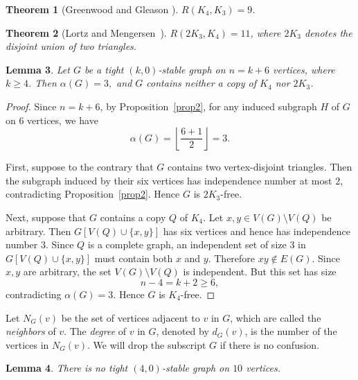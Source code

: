 \def\CTeXPreproc{Created by ctex v0.2.14, don't edit!}\def\CTeXPreproc{Created by ctex v0.2.14, don't edit!}\documentclass[11pt, twoside]{article}
\newtheorem{lem}{Lemma}[section]
\newtheorem{thm}[lem]{Theorem}
\begin{document}
\begin{thm}[Greenwood and Gleason \cite{GreenwoodGleason1955}]\label{thm:RG}
	$R(K_4, K_3) = 9$.
\end{thm}

\begin{thm}[Lortz and Mengersen~\cite{LortzMengersen2011}]\label{thm:Ramsey2K3}
	$R(2K_3, K_4)=11$, where $2K_3$ denotes the disjoint union of two triangles.
\end{thm}


\begin{lem}\label{lem:c6}
	Let $G$ be a tight $(k,0)$-stable graph on $n=k+6$ vertices, where $ k\ge4 $. Then $	\alpha(G)=3,$ and $G$ contains neither a copy of $K_4$ nor $2K_3$.
\end{lem}

\begin{proof}
	Since $n=k+6$, by Proposition~\ref{prop2}, for any induced subgraph $ H $ of $ G $ on $ 6 $ vertices, we have
	\[
	\alpha(G)=\left\lfloor \frac{6+1}{2}\right\rfloor=3.
	\]
	
	First, suppose to the contrary that $G$ contains two vertex-disjoint triangles. Then the
	subgraph induced by their six vertices has independence number at most
	$2$, contradicting Proposition~\ref{prop2}. Hence $G$ is
	$2K_3$-free.
	
	Next, suppose that $G$ contains a copy $Q$ of $K_4$. Let
	$x,y\in V(G)\setminus V(Q)$ be arbitrary. Then $G[V(Q)\cup\{x,y\}]$ has
	six vertices and hence has independence number $3$. Since $Q$ is a
	complete graph, an independent set of size $3$ in
	$G[V(Q)\cup\{x,y\}]$ must contain both $x$ and $y$. Therefore
	$xy\notin E(G)$. Since $x,y$ are arbitrary, the set
	$V(G)\setminus V(Q)$ is independent. But this set has size
	\[
	n-4=k+2\geq 6,
	\]
	contradicting $\alpha(G)=3$. Hence $G$ is $K_4$-free.
\end{proof}

Let $ N_G(v) $ be the set of vertices adjacent to $ v $ in $ G $, which are called the  \textit{neighbors} of $ v $. The \textit{degree} of $ v $ in $ G $, denoted by $ d_G(v) $, is the number of the vertices in $ N_G(v) $. We will drop the subscript $ G $ if there is no confusion.

\begin{lem}\label{lem:no-ten}
	There is no tight $(4,0)$-stable graph on $10$ vertices.
\end{lem}
\end{document}
